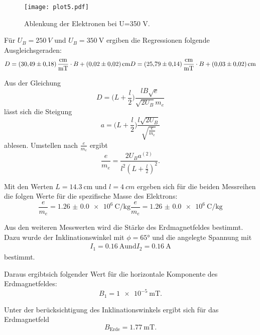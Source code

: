 \begin{figure}
  \centering
  \texttt{[image: plot5.pdf]}
  \caption{Ablenkung der Elektronen bei U=350\; V.}
  \label{fig:plot5}
\end{figure}

Für $U_{B}=\SI{250}{V}$ und $U_{B}=\SI{350}{\V}$ ergiben die Regressionen folgende Ausgleichsgeraden:
\begin{equation}
  D=\SI{30,49(18)}{\centi\meter\per\milli\tesla}\cdot B+\SI{0.02(2)}{\centi\meter}\\
  D=\SI{25.79(14)}{\centi\meter\per\milli\tesla}\cdot B+\SI{0.03(2)}{\centi\meter}
\end{equation}

Aus der Gleichung
\begin{equation}
  D=\biggl(L+\frac{l}{2}\biggr)\frac{lB\sqrt{e}}{\sqrt{2U_B}m_e}
\end{equation}
lässt sich die Steigung
\begin{equation}
  a=\biggl(L+\frac{l}{2}\biggr)\frac{l\sqrt{2U_B}}{\sqrt{\frac{e}{m_e}}}
  \label{eqn:steig}
\end{equation}
ablesen. Umstellen nach $\frac{e}{m_e}$
ergibt
\begin{equation}
  \frac{e}{m_e}= \frac{2U_{B} a^(2)}{l^{2}(L+\frac{l}{2})^{2}}.
  \label{em}
\end{equation}

Mit den Werten $L=\SI{14,3}{\cm}$ und $l=\SI{4}{cm}$ ergeben sich für die
beiden Messreihen die folgen Werte für die spezifische Masse des Elektrons:
\begin{equation*}
  \frac{e}{m_e}=\SI{1.26(0)e6}{\coulomb\per\kg}
  \frac{e}{m_e}=\SI{1.26(0)e6}{\coulomb\per\kg}
\end{equation*}




Aus den weiteren Messwerten wird die Stärke des Erdmagnetfeldes bestimmt. Dazu wurde der
Inklinationswinkel mit $\phi=65°$ und die angelegte Spannung mit
\begin{align*}
  I_1=\SI{0,16}{\A} \text{und} I_2=\SI{0,16}{\A}
\end{align*}
bestimmt.

Daraus ergibtsich folgender Wert für die horizontale Komponente des Erdmagnetfeldes:
\begin{equation*}
  B_1=\SI{1e-5}{\milli\tesla}.
\end{equation*}


Unter der berücksichtigung des Inklinationswinkels ergibt sich für das
Erdmagnetfeld
\begin{equation*}
  B_\text{Erde}=\SI{1,77}{\milli\tesla}.
\end{equation*}
